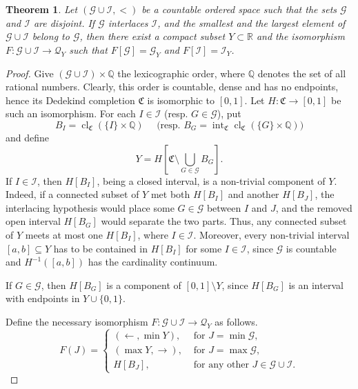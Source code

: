 \documentclass[12pt,a4paper,leqno]{amsart}
\newcommand{\cl}{\operatorname{cl}}
\renewcommand{\int}{\operatorname{int}}
\newtheorem{thm}{Theorem}
\theoremstyle{definition}
\begin{document}
   \begin{thm}\label{tr1}
 Let $(\mathcal  G \cup \mathcal I, <)$ be a countable  ordered space such that  the sets   $ \mathcal G$ and  $\mathcal I $ are disjoint. If $ \mathcal G$ interlaces  $\mathcal I $, and  the smallest and the largest element of $\mathcal  G \cup \mathcal I$ belong to $\mathcal G $, then there exist a compact subset $Y\subset \mathbb R$ and the isomorphism  $F\colon \mathcal G\cup \mathcal I \to \mathcal Q_Y$ such that  $F[\mathcal G] =\mathcal G_Y$ and 
$ F[\mathcal I] =\mathcal I_Y$.  
   \end{thm}
   \begin{proof}  Give $(\mathcal G\cup\mathcal I)\times\mathbb Q$ the lexicographic order, where $\mathbb Q$ denotes the set of all rational numbers. Clearly, this order is countable, dense and has no endpoints, hence its Dedekind completion $\mathfrak C$ is isomorphic to $[0,1]$. Let $H\colon \mathfrak C \to [0,1]$ be such an isomorphism.
For each $I\in \mathcal I$ (resp. $G\in \mathcal G$), put  
$$
B_I=\cl_{\mathfrak C}(\{I\}\times\mathbb Q) \quad \mbox{ (resp. } B_G=\int_{\mathfrak C} \cl_\mathfrak C(\{G\}\times\mathbb Q))$$ and 
define
$$\textstyle 
Y=H\left[\mathfrak C\setminus\bigcup_{G\in\mathcal G}B_G\right].$$
   \indent  If $I\in\mathcal I$, then $H[B_I]$, being a closed interval,  is a non-trivial component of $Y$. Indeed,  if a connected subset of $Y$ met both 
	$H[B_I]$ and another $H[B_{J}]$, the interlacing hypothesis would place some $G\in\mathcal G$ between $I$ and $J$, and the removed open interval $H[B_G]$ would separate the two parts.  Thus, any connected subset of $Y$ meets at most one $H[B_I]$, where $I\in\mathcal I$.	
	Moreover, every non-trivial interval $[a,b] \subseteq Y$ has to be contained in  $H[B_I]$ for some $I\in\mathcal I$, since
	$\mathcal G$ is countable and $H^{-1}([a,b])$ has the cardinality continuum. 
	
	
			If $G\in\mathcal G$, then $H[B_G]$ is a  component of $[0,1] \setminus Y$, since $H[B_G]$ is an interval with endpoints in $Y\cup \{0,1\}$.
			
			Define the necessary isomorphism   $F: \mathcal G\cup \mathcal I \to \mathcal Q_Y$  as follows.
  \[F(J)= \begin{cases}
	  (\leftarrow, \min Y),& \mbox{ for } J= \min \mathcal G,\\
		( \max Y,\rightarrow), & \mbox{ for } J=\max  \mathcal G,\\
		H[B_J],& \mbox{ for any other } J\in \mathcal G \cup \mathcal  I.
	\end{cases}\]			 
   \end{proof} 
	
\end{document}
